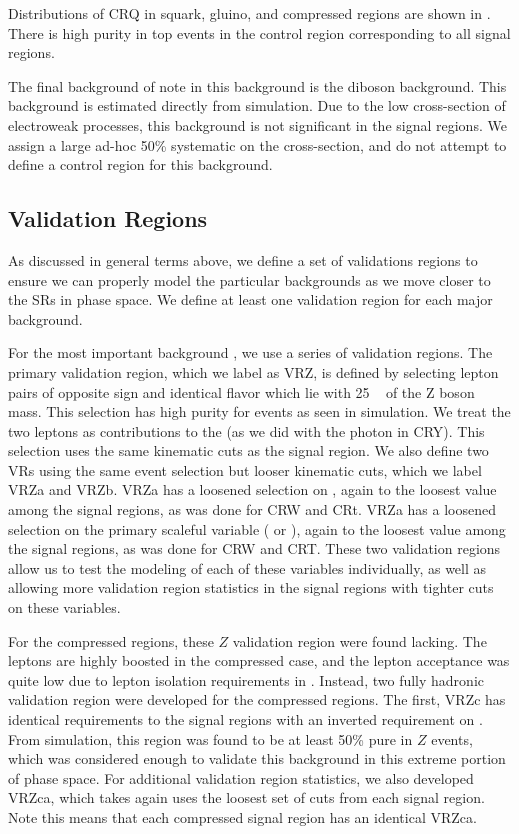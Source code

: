 Distributions of CRQ in squark, gluino, and compressed regions are shown in .
There is high purity in top events in the control region corresponding to all signal regions.

The final background of note in this background is the diboson background.
This background is estimated directly from simulation.
Due to the low cross-section of electroweak processes, this background is not significant in the signal regions.
We assign a large ad-hoc 50\% systematic on the cross-section, and do not attempt to define a control region for this background.



\subsection{Validation Regions}

As discussed in general terms above, we define a set of validations regions to ensure we can properly model the particular backgrounds as we move closer to the SRs in phase space.
We define at least one validation region for each major background.

For the most important background \Zvv, we use a series of validation regions.
The primary validation region, which we label as VRZ, is defined by selecting lepton pairs of opposite sign and identical flavor which lie with 25 \GeV~ of the Z boson mass.
This selection has high purity for \Zll events as seen in simulation.
We treat the two leptons as contributions to the \met (as we did with the photon in CRY).
This selection uses the same kinematic cuts as the signal region.
We also define two VRs using the same event selection but looser kinematic cuts, which we label VRZa and VRZb.
VRZa has a loosened selection on , again to the loosest value among the signal regions, as was done for CRW and CRt.
VRZa has a loosened selection on the primary scaleful variable  ( or ), again to the loosest value among the signal regions, as was done for CRW and CRT.
These two validation regions allow us to test the modeling of each of these variables individually, as well as allowing more validation region statistics in the signal regions with tighter cuts on these variables.

For the compressed regions, these $Z$ validation region were found lacking.
The leptons are highly boosted in the compressed case, and the lepton acceptance was quite low due to lepton isolation requirements in \deltaR.
Instead, two fully hadronic validation region were developed for the compressed regions.
The first, VRZc has identical requirements to the signal regions with an inverted requirement on \dphiISR.
From simulation, this region was found to be at least 50\% pure in $Z$ events, which was considered enough to validate this background in this extreme portion of phase space.
For additional validation region statistics, we also developed VRZca, which takes again uses the loosest set of cuts from each signal region.
Note this means that each compressed signal region has an identical VRZca.

